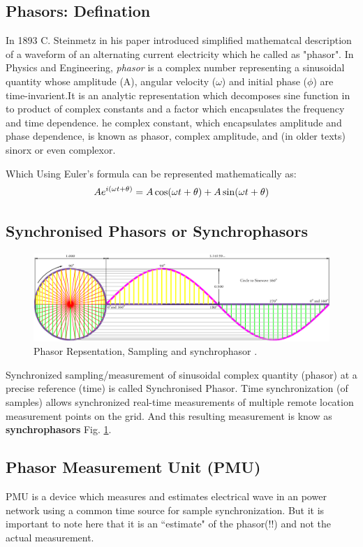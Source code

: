 \subsection{Phasors: Defination}

In 1893 C. Steinmetz in his paper introduced simplified mathematcal description of a waveform of an alternating current electricity which he called as "phasor". In Physics and Engineering, \textit{phasor} is a complex number representing a sinusoidal quantity whose amplitude (A), angular velocity ($\omega$) and initial phase ($\phi$) are time-invarient.It is an analytic representation which decomposes sine function in to product of complex constants and a factor which encapsulates the frequency and time dependence. he complex constant, which encapsulates amplitude and phase dependence, is known as phasor, complex amplitude, and (in older texts) sinorx or even complexor.

Which Using Euler's formula can be represented mathematically as:
\begin{equation}\boldmath
Ae^{i(\omega t + \theta)} = A\cos(\omega t + \theta) + A\sin(\omega t + \theta)
\end{equation}

\subsection{Synchronised Phasors or Synchrophasors}
\begin{figure}
	\includegraphics[width=\textwidth]{fig/Circle-To-Sine-Wave.png}
	\caption{Phasor Repsentation, Sampling and synchrophasor \cite{CirSinWave} .} 
	\label{fig:CirSin}
\end{figure}
 Synchronized sampling/measurement of sinusoidal complex quantity (phasor) at a precise reference (time) is called Synchronised Phasor. Time synchronization (of samples) allows synchronized real-time measurements of multiple remote location measurement points on the grid. And this resulting measurement is know as \textbf{synchrophasors} Fig. \ref{fig:CirSin}.
\subsection{Phasor Measurement Unit (PMU)}
PMU is a device which measures and estimates electrical wave in an power network using a common time source for sample synchronization. But it is important to note here that it is an ``estimate" of the phasor(!!) and not the actual measurement. 

